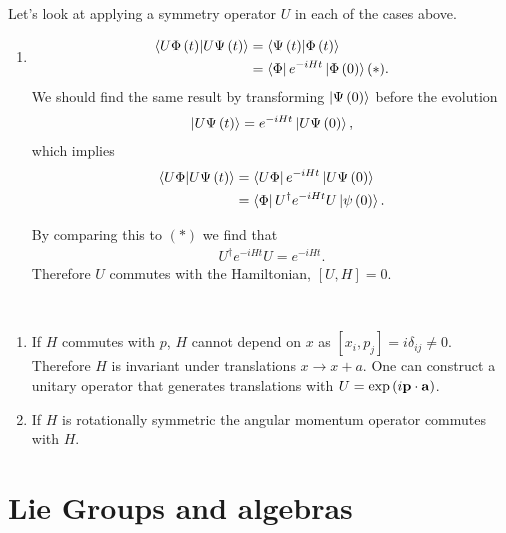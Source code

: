 Let's look at applying a symmetry operator $U$ in each of the cases above.

\begin{enumerate}[label=\alph*)]
    \item
        \begin{align}
            \bra{U \Phi \left( t \right) } \ket{U \Psi \left( t \right) } &= \bra{\Psi \left( t \right) } \ket{\Phi \left( t \right) } \\
            &= \bra{\Phi} e^{-i H t} \ket{\Phi \left( 0 \right) } (*)
        .\end{align}
        We should find the same result by transforming $\ket{\Psi \left( 0 \right) }$ before the evolution
        \begin{align}
            \ket{U \Psi \left( t \right) } = e^{-i H t} \ket{U \Psi \left( 0 \right) }
        ,\end{align}
        which implies
        \begin{align}
            \bra{U \Phi} \ket{U \Psi \left( t \right) } &= \bra{U \Phi} e^{-i H t} \ket{U \Psi \left( 0 \right) } \\
            &= \bra{ \Phi} U^{\dag} e^{-i H t} U \ket{\psi \left( 0 \right) } 
        .\end{align}

        By comparing this to $(*)$ we find that
        \begin{align}
            U^{\dag} e^{-i H t} U = e^{-i H t}
        .\end{align}
        Therefore $U$ commutes with the Hamiltonian, $\left[ U, H \right] = 0$.
\end{enumerate}

\begin{examples}~
    \begin{enumerate}[label=\arabic*)]
        \item If $H$ commutes with $p$, $H$ cannot depend on $x$ as $\left[ x_{i}, p_{j} \right] = i \delta_{ij} \neq 0$. Therefore $H$ is invariant under translations $x \to x + a$. One can construct a unitary operator that generates translations with $U = \exp \left( i \vb{p} \cdot \vb{a} \right) $.
        \item If $H$ is rotationally symmetric the angular momentum operator commutes with $H$.
    \end{enumerate}
\end{examples}

\section{Lie Groups and algebras}

